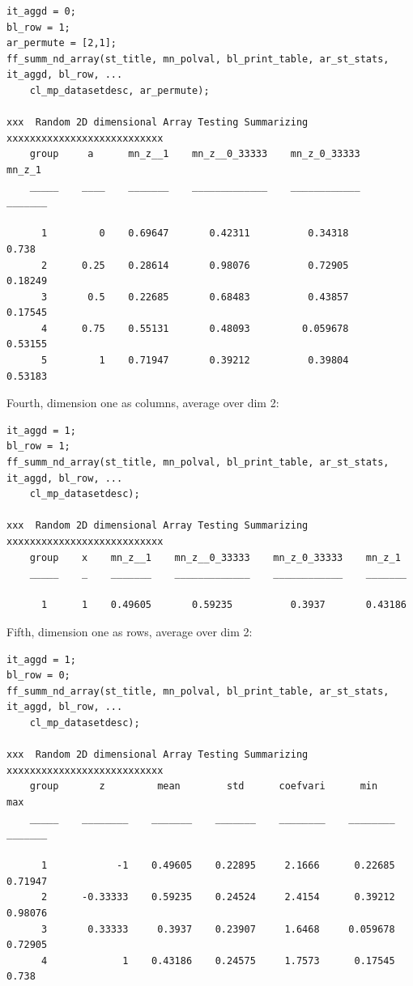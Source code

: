 \documentclass[
]{book}
\begin{document}
\begin{verbatim}
it_aggd = 0; 
bl_row = 1; 
ar_permute = [2,1];
ff_summ_nd_array(st_title, mn_polval, bl_print_table, ar_st_stats, it_aggd, bl_row, ...
    cl_mp_datasetdesc, ar_permute);

xxx  Random 2D dimensional Array Testing Summarizing  xxxxxxxxxxxxxxxxxxxxxxxxxxx
    group     a      mn_z__1    mn_z__0_33333    mn_z_0_33333    mn_z_1 
    _____    ____    _______    _____________    ____________    _______

      1         0    0.69647       0.42311          0.34318        0.738
      2      0.25    0.28614       0.98076          0.72905      0.18249
      3       0.5    0.22685       0.68483          0.43857      0.17545
      4      0.75    0.55131       0.48093         0.059678      0.53155
      5         1    0.71947       0.39212          0.39804      0.53183
\end{verbatim}

Fourth, dimension one as columns, average over dim 2:

\begin{verbatim}
it_aggd = 1; 
bl_row = 1; 
ff_summ_nd_array(st_title, mn_polval, bl_print_table, ar_st_stats, it_aggd, bl_row, ...
    cl_mp_datasetdesc);

xxx  Random 2D dimensional Array Testing Summarizing  xxxxxxxxxxxxxxxxxxxxxxxxxxx
    group    x    mn_z__1    mn_z__0_33333    mn_z_0_33333    mn_z_1 
    _____    _    _______    _____________    ____________    _______

      1      1    0.49605       0.59235          0.3937       0.43186
\end{verbatim}

Fifth, dimension one as rows, average over dim 2:

\begin{verbatim}
it_aggd = 1; 
bl_row = 0; 
ff_summ_nd_array(st_title, mn_polval, bl_print_table, ar_st_stats, it_aggd, bl_row, ...
    cl_mp_datasetdesc);

xxx  Random 2D dimensional Array Testing Summarizing  xxxxxxxxxxxxxxxxxxxxxxxxxxx
    group       z         mean        std      coefvari      min         max  
    _____    ________    _______    _______    ________    ________    _______

      1            -1    0.49605    0.22895     2.1666      0.22685    0.71947
      2      -0.33333    0.59235    0.24524     2.4154      0.39212    0.98076
      3       0.33333     0.3937    0.23907     1.6468     0.059678    0.72905
      4             1    0.43186    0.24575     1.7573      0.17545      0.738
\end{verbatim}
\end{document}
